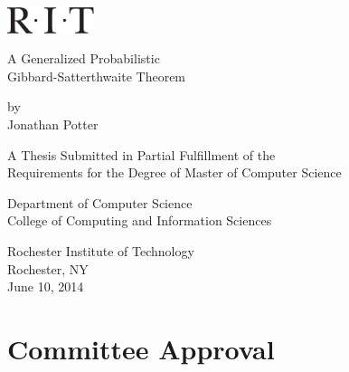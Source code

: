 \begin{titlepage}
	\begin{center}
		\includegraphics[width=1in]{../figures/rit_logo.pdf}

		\vspace{1cm}

		\LARGE A Generalized Probabilistic \\ Gibbard-Satterthwaite Theorem

		\vspace{3cm}

		\large by \\
		Jonathan Potter

		\vspace{3cm}

		\normalsize A Thesis Submitted in Partial Fulfillment of the \\ Requirements for the Degree of Master of Computer Science

		\vspace{0.5cm}

		Department of Computer Science \\
		College of Computing and Information Sciences

		\vspace{\fill}

		\large Rochester Institute of Technology \\
		Rochester, NY \\
		June 10, 2014
	\end{center}

	\clearpage

	\chapter*{Committee Approval}

	\vspace{1.5cm}
	\vspace{1.5cm}
	\vspace{1.5cm}
\end{titlepage}
